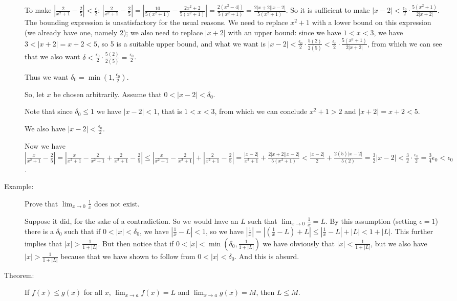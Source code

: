 \documentclass[12pt]{article}
\begin{document}
\begin{description}
To make $|\frac{2}{x^2+1}-\frac25|<\frac{\epsilon}2$:  $|\frac{2}{x^2+1}-\frac25| = |\frac{10}{5(x^2+1)} - \frac{2x^2+2}{5(x^2+1)}| = \frac {2(x^2-4|)}{5(x^2+1)}= \frac{2|x+2||x-2|}{5(x^2+1)}$.  So it is sufficient
to make $|x-2|<\frac{\epsilon_0}2\cdot\frac{5(x^2+1)}{2|x+2|}$.  The bounding expression is unsatisfactory for the usual reasons.  We need to replace $x^2+1$ with a lower bound on this expression (we already have one, namely 2);
we also need to replace $|x+2|$ with an upper bound:  since we have $1<x<3$, we have $3<|x+2|=x+2<5$, so 5 is a suitable upper bound, and what we want is $|x-2|<\frac{\epsilon_0}2\cdot\frac{5(2)}{2(5)}<\frac{\epsilon_0}2\cdot\frac{5(x^2+1)}{2|x+2|}$, from which we can see that we also want $\delta<\frac{\epsilon_0}2\cdot\frac{5(2)}{2(5)}=\frac{\epsilon_0}2$.  

Thus we want $\delta_0 = \min(1,\frac{\epsilon_0}2)$.

So, let $x$ be chosen arbitrarily.  Assume that $0<|x-2|<\delta_0$.

Note that since $\delta_0\leq 1$ we have $|x-2|<1$, that is $1<x<3$, from which we can conclude $x^2+1 > 2$ and $|x+2|=x+2<5$.

We also have $|x-2|<\frac{\epsilon_0}2$.

Now we have $|\frac{x}{x^2+1}-\frac25|  = |\frac{x}{x^2+1}-\frac{2}{x^2+1}+\frac{2}{x^2+1}-\frac25| \leq
|\frac{x}{x^2+1}-\frac{2}{x^2+1}|+|\frac{2}{x^2+1}-\frac25| = \frac{|x-2|}{x^2+1} + \frac{2|x+2||x-2|}{5(x^2+1)} < \frac{|x-2|}{2} + \frac{2(5)|x-2|}{5(2)} = \frac 32|x-2| <\frac 32\cdot\frac{\epsilon_0}2=\frac34\epsilon_0<\epsilon_0$.



\item[Example:] Prove that  $\lim_{x \rightarrow 0}\frac 1x$ does not exist.

Suppose it did, for the sake of a contradiction. So we would have an $L$ such that $\lim_{x \rightarrow 0}\frac1x=L$.   By this assumption (setting $\epsilon  =1$) there is a $\delta_0$ such that
if $0<|x|<\delta_0$, we have $|\frac1x -L|<1$, so we have $|\frac 1x|=|(\frac1x - L) + L|\leq |\frac1x -L| + |L|<1+|L|$.  This further implies that $|x|>\frac1{1+|L|}$.  But then notice that if
$0<|x|<\min(\delta_0,\frac1{1+|L|})$ we have obviously that $|x|<\frac1{1+|L|}$, but we also have $|x|>\frac1{1+|L|}$ because that we have shown to follow from $0<|x|<\delta_0$.  And this is absurd.

\item[Theorem:]  If $f(x)\leq g(x)$ for all $x$, $\lim_{x \rightarrow a}f(x)=L$ and $\lim_{x \rightarrow a}g(x)=M$,
then $L \leq M$.


\end{description}
\end{document}
